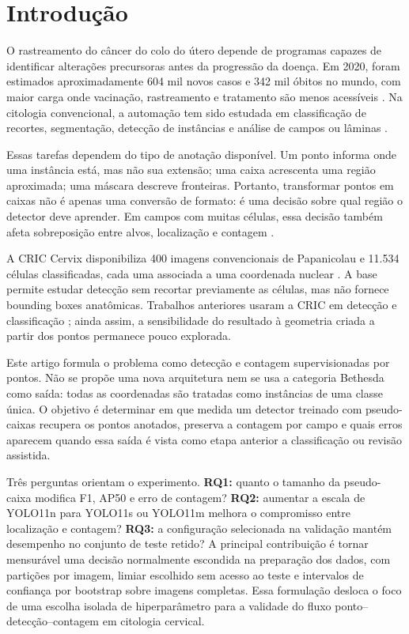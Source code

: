 \section{Introdu\c{c}\~ao}

O rastreamento do c\^ancer do colo do \'utero depende de programas capazes de
identificar altera\c{c}\~oes precursoras antes da progress\~ao da doen\c{c}a. Em
2020, foram estimados aproximadamente 604 mil novos casos e 342 mil \'obitos no
mundo, com maior carga onde vacina\c{c}\~ao, rastreamento e tratamento s\~ao menos
acess\'iveis \cite{singh2023global}. Na citologia convencional, a automa\c{c}\~ao
tem sido estudada em classifica\c{c}\~ao de recortes, segmenta\c{c}\~ao,
detec\c{c}\~ao de inst\^ancias e an\'alise de campos ou l\^aminas
\cite{jiang2023systematic}.

Essas tarefas dependem do tipo de anota\c{c}\~ao dispon\'ivel. Um ponto informa
onde uma inst\^ancia est\'a, mas n\~ao sua extens\~ao; uma caixa acrescenta uma
regi\~ao aproximada; uma m\'ascara descreve fronteiras. Portanto, transformar
pontos em caixas n\~ao \'e apenas uma convers\~ao de formato: \'e uma decis\~ao
sobre qual regi\~ao o detector deve aprender. Em campos com muitas c\'elulas, essa
decis\~ao tamb\'em afeta sobreposi\c{c}\~ao entre alvos, localiza\c{c}\~ao e contagem
\cite{chen2023p2bnet,chen2021sparsepoints,xia2023colorization}.

A CRIC Cervix disponibiliza 400 imagens convencionais de Papanicolau e 11.534
c\'elulas classificadas, cada uma associada a uma coordenada nuclear
\cite{rezende2021cric}. A base permite estudar detec\c{c}\~ao sem recortar
previamente as c\'elulas, mas n\~ao fornece bounding boxes anat\^omicas. Trabalhos
anteriores usaram a CRIC em detec\c{c}\~ao e classifica\c{c}\~ao
\cite{kalbhor2023cervicell}; ainda assim, a sensibilidade do resultado \`a
geometria criada a partir dos pontos permanece pouco explorada.

Este artigo formula o problema como detec\c{c}\~ao e contagem supervisionadas por
pontos. N\~ao se prop\~oe uma nova arquitetura nem se usa a categoria Bethesda
como sa\'ida: todas as coordenadas s\~ao tratadas como inst\^ancias de uma classe
\'unica. O objetivo \'e determinar em que medida um detector treinado com
pseudo-caixas recupera os pontos anotados, preserva a contagem por campo e quais
erros aparecem quando essa sa\'ida \'e vista como etapa anterior a classifica\c{c}\~ao
ou revis\~ao assistida.

Tr\^es perguntas orientam o experimento. \textbf{RQ1:} quanto o tamanho da
pseudo-caixa modifica F1, AP50 e erro de contagem? \textbf{RQ2:} aumentar a
escala de YOLO11n para YOLO11s ou YOLO11m melhora o compromisso entre
localiza\c{c}\~ao e contagem? \textbf{RQ3:} a configura\c{c}\~ao selecionada na
valida\c{c}\~ao mant\'em desempenho no conjunto de teste retido? A principal
contribui\c{c}\~ao \'e tornar mensur\'avel uma decis\~ao normalmente escondida na
prepara\c{c}\~ao dos dados, com parti\c{c}\~oes por imagem, limiar escolhido sem
acesso ao teste e intervalos de confian\c{c}a por bootstrap sobre imagens
completas. Essa formula\c{c}\~ao desloca o foco de uma escolha isolada de
hiperpar\^ametro para a validade do fluxo ponto--detec\c{c}\~ao--contagem em
citologia cervical.
